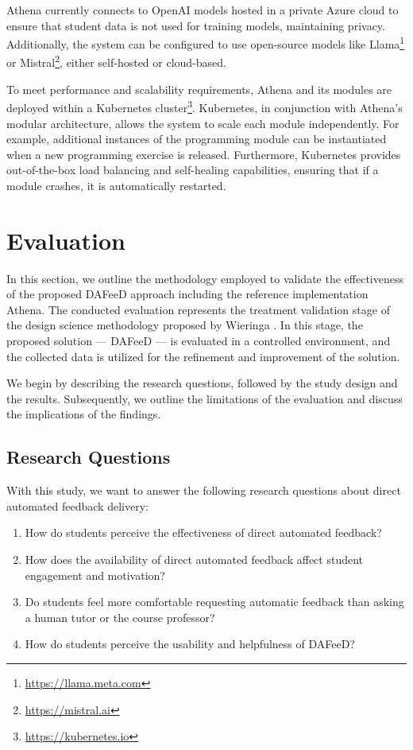 \documentclass[manuscript,screen,review]{acmart}
\begin{document}
Athena currently connects to OpenAI models hosted in a private Azure cloud to ensure that student data is not used for training models, maintaining privacy.
Additionally, the system can be configured to use open-source models like Llama\footnote{\url{https://llama.meta.com}} or Mistral\footnote{\url{https://mistral.ai}}, either self-hosted or cloud-based.

To meet performance and scalability requirements, Athena and its modules are deployed within a Kubernetes cluster\footnote{\url{https://kubernetes.io}}.
Kubernetes, in conjunction with Athena's modular architecture, allows the system to scale each module independently.
For example, additional instances of the programming module can be instantiated when a new programming exercise is released.
Furthermore, Kubernetes provides out-of-the-box load balancing and self-healing capabilities, ensuring that if a module crashes, it is automatically restarted.


\section{Evaluation} %
\label{sec:evaluation}

In this section, we outline the methodology employed to validate the effectiveness of the proposed DAFeeD approach including the reference implementation Athena.
The conducted evaluation represents the treatment validation stage of the design science methodology proposed by Wieringa \cite{wieringa:2014:DesignScienceMethodologya}.
In this stage, the proposed solution — DAFeeD — is evaluated in a controlled environment, and the collected data is utilized for the refinement and improvement of the solution.

We begin by describing the research questions, followed by the study design and the results.
Subsequently, we outline the limitations of the evaluation and discuss the implications of the findings.


\subsection{Research Questions}

With this study, we want to answer the following research questions about direct automated feedback delivery:

\begin{enumerate}[label=\textbf{RQ\arabic*}]
  \item How do students perceive the effectiveness of direct automated feedback?
  \item How does the availability of direct automated feedback affect student engagement and motivation?
  \item Do students feel more comfortable requesting automatic feedback than asking a human tutor or the course professor?
  \item How do students perceive the usability and helpfulness of DAFeeD?
\end{enumerate}
\end{document}
